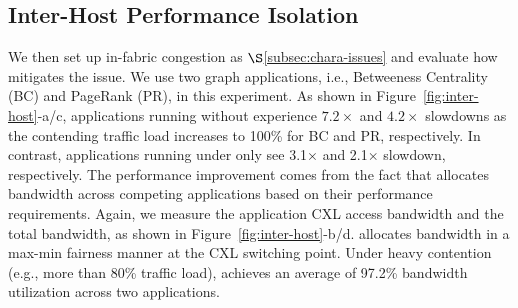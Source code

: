 




\subsection{Inter-Host Performance Isolation}
\label{subsec:eval-infabric}

We then set up in-fabric congestion as $\S$\ref{subsec:chara-issues} and evaluate how \sys mitigates the issue. We use two graph applications, i.e., Betweeness Centrality (BC) and PageRank (PR), in this experiment. As shown in Figure~\ref{fig:inter-host}-a/c, applications running without \sys experience $7.2\times$ and $4.2\times$ slowdowns as the contending traffic load increases to 100\% for BC and PR, respectively. In contrast, applications running under \sys only see 3.1$\times$ and 2.1$\times$ slowdown, respectively. The performance improvement comes from the fact that \sys allocates bandwidth across competing applications based on their performance requirements. Again, we measure the application CXL access bandwidth and the total bandwidth, as shown in Figure~\ref{fig:inter-host}-b/d. \sys allocates bandwidth in a max-min fairness manner at the CXL switching point. Under heavy contention (e.g., more than 80\% traffic load), \sys achieves an average of 97.2\% bandwidth utilization across two applications.

